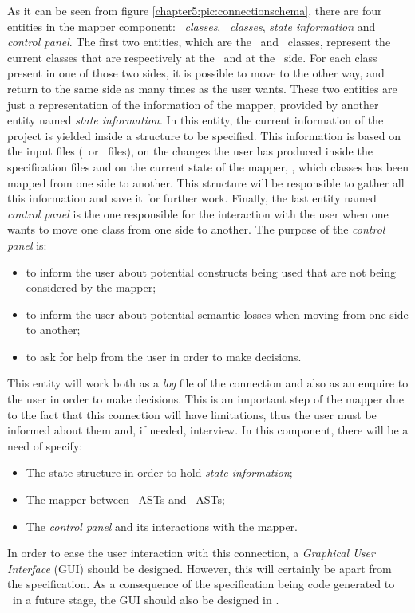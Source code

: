 As it can be seen from figure \ref{chapter5:pic:connectionschema}, there are four entities in the mapper component: \vpp\ \textit{classes}, \jml\ \textit{classes}, \textit{state information} and \textit{control panel}. The first two entities, which are the \vpp\ and \jml\ classes, represent the current classes that are respectively at the \vpp\ and at the \jml\ side. For each class present in one of those two sides, it is possible to move to the other way, and return to the same side as many times as the user wants. These two entities are just a representation of the information of the mapper, provided by another entity named \textit{state information}. In this entity, the current information of the project is yielded inside a structure to be specified. This information is based on the input files (\vpp\ or \jml\ files), on the changes the user has produced inside the specification files and on the current state of the mapper, \ie, which classes has been mapped from one side to another. This structure will be responsible to gather all this information and save it for further work. Finally, the last entity named \textit{control panel} is the one responsible for the interaction with the user when one wants to move one class from one side to another. The purpose of the \textit{control panel} is:
\begin{itemize}
\item to inform the user about potential constructs being used that are not being considered by the mapper;
\item to inform the user about potential semantic losses when moving from one side to another;
\item to ask for help from the user in order to make decisions.
\end{itemize}
This entity will work both as a \textit{log} file of the connection and also as an enquire to the user in order to make decisions. This is an important step of the mapper due to the fact that this connection will have limitations, thus the user must be informed about them and, if needed, interview. In this component, there will be a need of specify:
\begin{itemize}
\item The state structure in order to hold \textit{state information};
\item The mapper between \vpp\ ASTs and \jml\ ASTs;
\item The \textit{control panel} and its interactions with the mapper.
\end{itemize}
In order to ease the user interaction with this connection, a \textit{Graphical User Interface} (GUI) should be designed. However, this will certainly be apart from the specification. As a consequence of the specification being code generated to \java\ in a future stage, the GUI should also be designed in \java.

